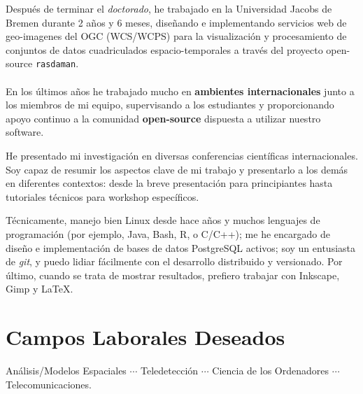 \documentclass[10pt]{article}
\begin{document}
Despu\'es de terminar el \emph{doctorado}, he trabajado en la Universidad Jacobs de Bremen durante 
2 a\~nos y 6 meses, dise\~nando e implementando servicios web de geo-imagenes del OGC (WCS\slash WCPS)
para la visualizaci\'on y procesamiento de conjuntos de datos cuadriculados espacio-temporales
a trav\'es del proyecto \mbox{open-source} \texttt{rasdaman}.
~\\ ~\\
En los \'ultimos a\~nos he trabajado mucho en \textbf{ambientes internacionales} junto a los 
miembros de mi equipo, supervisando a los estudiantes y proporcionando apoyo continuo a la 
comunidad \mbox{\textbf{open-source}} dispuesta a utilizar nuestro software.

He presentado mi investigaci\'on en diversas conferencias cient\'ificas internacionales.
Soy capaz de resumir los aspectos clave de mi trabajo y presentarlo a los dem\'as en 
diferentes contextos: desde la breve presentaci\'on para principiantes hasta tutoriales
t\'ecnicos para workshop espec\'ificos.

T\'ecnicamente, manejo bien Linux desde hace a\~nos y muchos lenguajes de programaci\'on 
(por ejemplo, Java, Bash, R, o C\slash C++); me he encargado de dise\~no e implementaci\'on de bases 
de datos PostgreSQL activos; soy un entusiasta de \textsl{git}, y puedo lidiar f\'acilmente con el 
desarrollo distribuido y versionado.
Por \'ultimo, cuando se trata de mostrar resultados, prefiero trabajar con Inkscape, Gimp y \LaTeX{}.

\section*{Campos Laborales Deseados}
{\normalsize An\'alisis\slash Modelos Espaciales $\cdots$ Teledetecci\'on $\cdots$ Ciencia de los Ordenadores $\cdots$ Telecomunicaciones.}

\pagebreak
\end{document}
